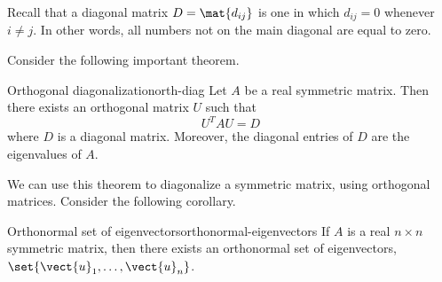 Recall that a diagonal matrix $D=\mat{d_{ij} }$ is one in which $d_{ij} = 0$ whenever $i \neq j$. In other words, all numbers not on the main diagonal are equal to zero.

Consider the following important theorem.

\begin{theorem}{Orthogonal diagonalization}{orth-diag}
Let $A$ be a real symmetric matrix. Then there exists an
orthogonal matrix $U$ such that
\[
U^{T}AU = D
\]
where $D$ is a diagonal matrix. Moreover,
the diagonal entries of $D$ are the eigenvalues of $A$.
\end{theorem}

We can use this theorem to diagonalize a symmetric matrix, using orthogonal matrices. Consider the following corollary.

\begin{corollary}{Orthonormal set of eigenvectors}{orthonormal-eigenvectors}
If $A$ is a real $n\times n$ symmetric matrix, then there exists an
orthonormal set of eigenvectors, $\set{\vect{u}_{1},\ldots,\vect{u}
_{n}}$.
\end{corollary}

